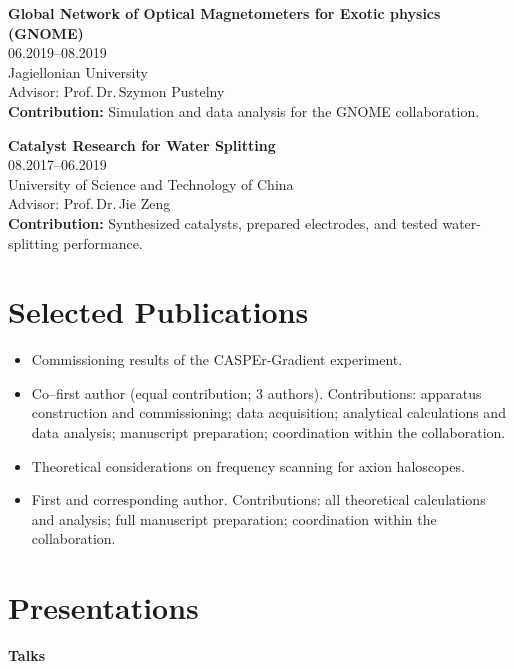 \noindent\textbf{Global Network of Optical Magnetometers for Exotic physics (GNOME)}\\
06.2019--08.2019 \\
Jagiellonian University \\
Advisor: Prof.\,Dr.\,Szymon Pustelny\\
\textbf{Contribution:} Simulation and data analysis for the GNOME collaboration.

\vspace{0.5em}

\noindent\textbf{Catalyst Research for Water Splitting} \\
08.2017--06.2019 \\
University of Science and Technology of China \\
Advisor: Prof.\,Dr.\,Jie Zeng\\
\textbf{Contribution:} Synthesized catalysts, prepared electrodes, and tested water-splitting performance.

\section*{Selected Publications}

\noindent
{}
\noindent[1] 
\begin{itemize}
    \item Commissioning results of the CASPEr-Gradient experiment.
    \item Co--first author (equal contribution; 3 authors). Contributions: apparatus construction and commissioning; data acquisition; analytical calculations and data analysis; manuscript preparation; coordination within the collaboration.
\end{itemize}

\noindent[2] 
\begin{itemize}
    \item Theoretical considerations on frequency scanning for axion haloscopes.
    \item First and corresponding author. Contributions: all theoretical calculations and analysis; full manuscript preparation; coordination within the collaboration.
\end{itemize}


\section*{Presentations}
\noindent\textbf{Talks}

